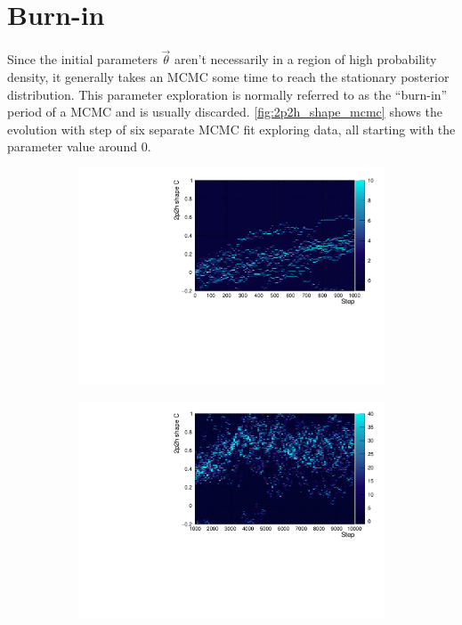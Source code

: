 \section{Burn-in}
Since the initial parameters $\vec{\theta}$ aren't necessarily in a region of high probability density, it generally takes an MCMC some time to reach the stationary posterior distribution. This parameter exploration is normally referred to as the ``burn-in'' period of a MCMC and is usually discarded. \autoref{fig:2p2h_shape_mcmc} shows the evolution with step of six separate MCMC fit exploring data, all starting with the parameter value around 0. 

\begin{figure}[h]
	\begin{subfigure}[t]{0.40\textwidth}
		\includegraphics[width=\textwidth, trim={0mm 0mm 0mm 0mm}, clip,page=1]{figures/mcmc/2p2h_shape_C_step}
	\end{subfigure}
	\begin{subfigure}[t]{0.40\textwidth}
		\includegraphics[width=\textwidth, trim={0mm 0mm 0mm 0mm}, clip,page=1]{figures/mcmc/2p2h_shape_C_step2}
	\end{subfigure}
	

\end{figure}
